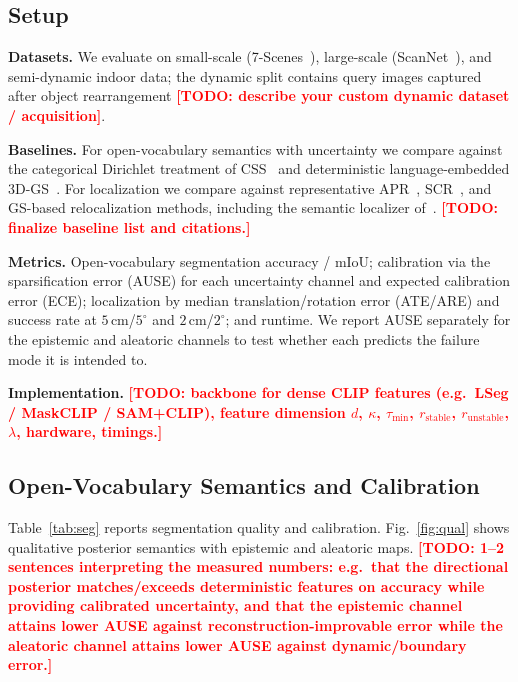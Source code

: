 \documentclass[journal]{IEEEtran}
\newcommand{\todo}[1]{\textcolor{red}{\textbf{[TODO: #1]}}}
\begin{document}
\subsection{Setup}
\textbf{Datasets.} We evaluate on small-scale (7-Scenes~\cite{glocker2013}),
large-scale (ScanNet~\cite{dai2017scannet}), and semi-dynamic indoor data; the
dynamic split contains query images captured after object rearrangement
\todo{describe your custom dynamic dataset / acquisition}.

\textbf{Baselines.} For open-vocabulary semantics with uncertainty we compare
against the categorical Dirichlet treatment of CSS~\cite{wilson2025css} and
deterministic language-embedded 3D-GS~\cite{qin2024langsplat,
zhou2024feature, wu2024opengaussian}. For localization we compare against
representative APR~\cite{chen2024marepo}, SCR~\cite{brachmann2023ace}, and
GS-based relocalization methods, including the semantic localizer
of~\cite{chu2026semantic}. \todo{finalize baseline list and citations.}

\textbf{Metrics.} Open-vocabulary segmentation accuracy / mIoU; calibration via
the sparsification error (AUSE) for each uncertainty channel and expected
calibration error (ECE); localization by median translation/rotation error
(ATE/ARE) and success rate at $5\,$cm/$5^\circ$ and $2\,$cm/$2^\circ$; and
runtime. We report AUSE separately for the epistemic and aleatoric channels to
test whether each predicts the failure mode it is intended to.

\textbf{Implementation.} \todo{backbone for dense CLIP features (e.g.\ LSeg /
MaskCLIP / SAM+CLIP), feature dimension $d$, $\kappa$, $\tau_{\min}$,
$r_{\mathrm{stable}}$, $r_{\mathrm{unstable}}$, $\lambda$, hardware, timings.}

\subsection{Open-Vocabulary Semantics and Calibration}
Table~\ref{tab:seg} reports segmentation quality and calibration.
Fig.~\ref{fig:qual} shows qualitative posterior semantics with epistemic and
aleatoric maps. \todo{1--2 sentences interpreting the measured numbers: e.g.\
that the directional posterior matches/exceeds deterministic features on
accuracy while providing calibrated uncertainty, and that the epistemic channel
attains lower AUSE against reconstruction-improvable error while the aleatoric
channel attains lower AUSE against dynamic/boundary error.}
\end{document}
